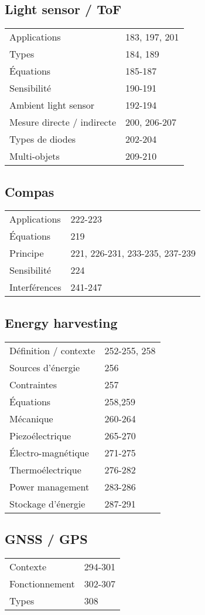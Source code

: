 \documentclass[]{article}
\begin{document}
\begin{multicols}{2}
\subsection{Light sensor / ToF}
\begin{tabular}{ll}
Applications & 183, 197, 201\\
Types & 184, 189\\
Équations & 185-187\\
Sensibilité & 190-191\\
Ambient light sensor & 192-194\\
Mesure directe / indirecte & 200, 206-207\\
Types de diodes & 202-204\\
Multi-objets & 209-210\\
\end{tabular}
\subsection{Compas}
\begin{tabular}{ll}
Applications & 222-223\\
Équations & 219\\
Principe & 221, 226-231, 233-235, 237-239\\
Sensibilité & 224\\
Interférences & 241-247\\
\end{tabular}
\subsection{Energy harvesting}
\begin{tabular}{ll}
Définition / contexte & 252-255, 258\\
Sources d'énergie & 256\\
Contraintes & 257\\
Équations & 258,259\\
Mécanique & 260-264\\
Piezoélectrique & 265-270\\
Électro-magnétique & 271-275\\
Thermoélectrique & 276-282\\
Power management & 283-286\\
Stockage d'énergie & 287-291\\
\end{tabular}
\subsection{GNSS / GPS}
\begin{tabular}{ll}
Contexte & 294-301\\
Fonctionnement & 302-307\\
Types & 308
\end{tabular}






\end{multicols}
\end{document}
